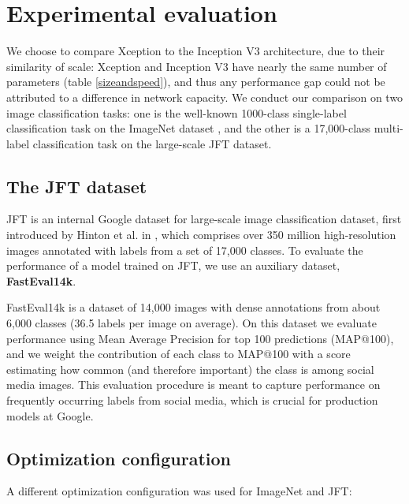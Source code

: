 \documentclass[10pt,twocolumn,letterpaper]{article}
\begin{document}
\section{Experimental evaluation}

We choose to compare Xception to the Inception V3 architecture, due to their similarity of scale: Xception and Inception V3 have nearly the same number of parameters (table \ref{sizeandspeed}), and thus any performance gap could not be attributed to a difference in network capacity. We conduct our comparison on two image classification tasks: one is the well-known 1000-class single-label classification task on the ImageNet dataset \cite{russakovsky2014imagenet}, and the other is a 17,000-class multi-label classification task on the large-scale JFT dataset.


\subsection{The JFT dataset}

JFT is an internal Google dataset for large-scale image classification dataset, first introduced by Hinton et al. in \cite{hinton15}, which comprises over 350 million high-resolution images annotated with labels from a set of 17,000 classes. To evaluate the performance of a model trained on JFT, we use an auxiliary dataset, \textbf{FastEval14k}.

FastEval14k is a dataset of 14,000 images with dense annotations from about 6,000 classes (36.5 labels per image on average). On this dataset we evaluate performance using Mean Average Precision for top 100 predictions (MAP@100), and we weight the contribution of each class to MAP@100 with a score estimating how common (and therefore important) the class is among social media images. This evaluation procedure is meant to capture performance on frequently occurring labels from social media, which is crucial for production models at Google.


\subsection{Optimization configuration}

A different optimization configuration was used for ImageNet and JFT:
\end{document}
